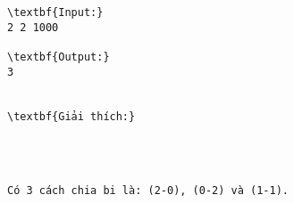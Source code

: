 \begin{verbatim}
\textbf{Input:}
2 2 1000

\textbf{Output:}
3


\textbf{Giải thích:}




Có 3 cách chia bi là: (2-0), (0-2) và (1-1).\end{verbatim}
